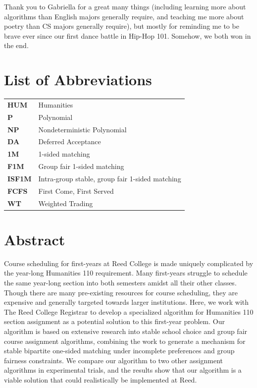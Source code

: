 \documentclass[12pt,twoside]{reedthesis}
\theoremstyle{definition} \newtheorem{definition}[theorem]{Definition}
\theoremstyle{remark} \newtheorem{remark}[theorem]{Remark}
\begin{document}
Thank you to Gabriella for a great many things (including learning more about
algorithms than English majors generally require, and teaching me
more about poetry than CS majors generally require), but mostly for
reminding me to be brave ever since our first dance battle in Hip-Hop 101. Somehow, we both won in the end.    

\chapter*{List of Abbreviations} \begin{table}[h] \centering %
  \begin{tabular}{ll} 
    \textbf{HUM}   & Humanities \\
    \textbf{P}  	 & Polynomial \\ 
    \textbf{NP}  	 &  Nondeterministic Polynomial \\ 
    \textbf{DA}    & Deferred Acceptance \\
    \textbf{1M}    & 1-sided matching \\
    \textbf{F1M}   & Group fair 1-sided matching \\
    \textbf{ISF1M} & Intra-group stable, group fair 1-sided matching \\
    \textbf{FCFS}  & First Come, First Served \\
    \textbf{WT}    & Weighted Trading \\
\end{tabular} \end{table}

\tableofcontents

\listoffigures

\chapter*{Abstract}
Course scheduling for first-years at Reed College is made uniquely complicated
by the year-long Humanities 110 requirement. Many first-years struggle to
schedule the same year-long section into both semesters amidst all their other
classes. Though there are many pre-existing resources
for course scheduling, they are expensive and generally targeted towards larger
institutions. Here, we work with The Reed College Registrar to develop a specialized
algorithm for Humanities 110 section assignment as a potential solution to this
first-year problem. Our algorithm is based on extensive research into stable
school choice and group fair course assignment algorithms, combining the work to
generate a mechanism for stable bipartite one-sided matching under
incomplete preferences and group fairness constraints. We compare our algorithm
to two other assignment algorithms in experimental trials, and the results show
that our algorithm is a viable solution that could realistically be implemented
at Reed.  
\end{document}
